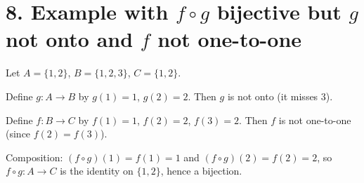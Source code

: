\section*{8. Example with $f\circ g$ bijective but $g$ not onto and $f$ not one-to-one}

Let $A=\{1,2\}$, $B=\{1,2,3\}$, $C=\{1,2\}$.

Define $g:A\to B$ by $g(1)=1$, $g(2)=2$. Then $g$ is not onto (it misses $3$).

Define $f:B\to C$ by $f(1)=1$, $f(2)=2$, $f(3)=2$. Then $f$ is not one-to-one
(since $f(2)=f(3)$).

Composition: $(f\circ g)(1)=f(1)=1$ and $(f\circ g)(2)=f(2)=2$,
so $f\circ g:A\to C$ is the identity on $\{1,2\}$, hence a bijection.
